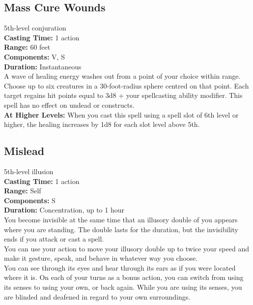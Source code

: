\documentclass[11pt, A4paper, english]{article}
\begin{document}
		\subsection{Mass Cure Wounds}
5th-level conjuration \\
\textbf{Casting Time:} 1 action \\
\textbf{Range:} 60 feet \\
\textbf{Components:} V, S \\
\textbf{Duration:} Instantaneous \\
A wave of healing energy washes out from a point of your choice within range. Choose up to six creatures in a 30-foot-radius sphere centred on that point. Each target regains hit points equal to 3d8 + your spellcasting ability modifier. This spell has no effect on undead or constructs. \\
\textbf{At Higher Levels:} When you cast this spell using a spell slot of 6th level or higher, the healing increases by 1d8 for each slot level above 5th.

		\subsection{Mislead}
5th-level illusion \\
\textbf{Casting Time:} 1 action \\
\textbf{Range:} Self \\
\textbf{Components:} S \\
\textbf{Duration:} Concentration, up to 1 hour \\
You become invisible at the same time that an illusory double of you appears where you are standing. The double lasts for the duration, but the invisibility ends if you attack or cast a spell. \\
You can use your action to move your illusory double up to twice your speed and make it gesture, speak, and behave in whatever way you choose. \\
You can see through its eyes and hear through its ears as if you were located where it is. On each of your turns as a bonus action, you can switch from using its senses to using your own, or back again. While you are using its senses, you are blinded and deafened in regard to your own surroundings.
\end{document}
